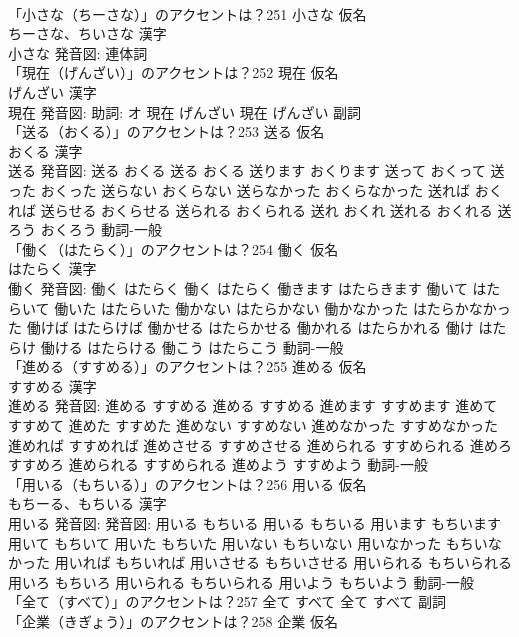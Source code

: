 \documentclass[8pt]{extreport}
\begin{document}
\begin{CJK}{UTF8}{min}
\\	「小さな（ちーさな）」のアクセントは？251	小さな 仮名　
\\	ちーさな、ちいさな 漢字　
\\	小さな 発音図:							連体詞 
\\	「現在（げんざい）」のアクセントは？252	現在 仮名　
\\	げんざい 漢字　
\\	現在 発音図: 助詞: オ	現在 げんざい		現在 げんざい				副詞 
\\	「送る（おくる）」のアクセントは？253	送る 仮名　
\\	おくる 漢字　
\\	送る 発音図:	送る おくる		送る おくる 送ります おくります 送って おくって 送った おくった 送らない おくらない 送らなかった おくらなかった 送れば おくれば 送らせる おくらせる 送られる おくられる 送れ おくれ 送れる おくれる 送ろう おくろう				動詞-一般 
\\	「働く（はたらく）」のアクセントは？254	働く 仮名　
\\	はたらく 漢字　
\\	働く 発音図:	働く はたらく		働く はたらく 働きます はたらきます 働いて はたらいて 働いた はたらいた 働かない はたらかない 働かなかった はたらかなかった 働けば はたらけば 働かせる はたらかせる 働かれる はたらかれる 働け はたらけ 働ける はたらける 働こう はたらこう				動詞-一般 
\\	「進める（すすめる）」のアクセントは？255	進める 仮名　
\\	すすめる 漢字　
\\	進める 発音図:	進める すすめる		進める すすめる 進めます すすめます 進めて すすめて 進めた すすめた 進めない すすめない 進めなかった すすめなかった 進めれば すすめれば 進めさせる すすめさせる 進められる すすめられる 進めろ すすめろ 進められる すすめられる 進めよう すすめよう				動詞-一般 
\\	「用いる（もちいる）」のアクセントは？256	用いる 仮名　
\\	もちーる、もちいる 漢字　
\\	用いる 発音図: 発音図:	用いる もちいる		用いる もちいる 用います もちいます 用いて もちいて 用いた もちいた 用いない もちいない 用いなかった もちいなかった 用いれば もちいれば 用いさせる もちいさせる 用いられる もちいられる 用いろ もちいろ 用いられる もちいられる 用いよう もちいよう				動詞-一般 
\\	「全て（すべて）」のアクセントは？257		全て すべて		全て すべて				副詞 
\\	「企業（きぎょう）」のアクセントは？258	企業 仮名　

\end{CJK}
\end{document}
